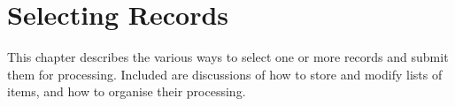 
\chapter{Selecting Records}
\label{cha:uselect}

This chapter describes the various ways to select one or more records
and submit them for processing. Included are discussions of how to
store and modify lists of items, and how to organise their processing.



